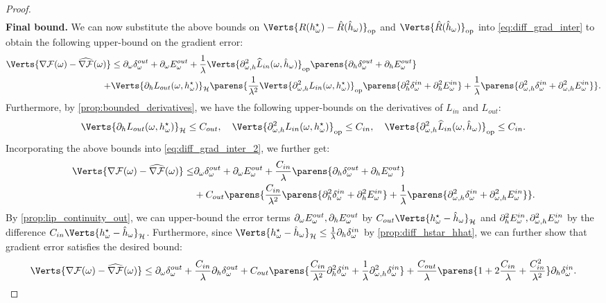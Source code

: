 \begin{proof}
\begin{align*}
    \end{align*}
{\bf Final bound.} We can now substitute the above bounds on $\Verts{R(h_{\omega}^{\star})- \hat{R}(\hat{h}_{\omega})}_{\op}$ and $\Verts{\hat{R}(\hat{h}_{\omega})}_{\op}$ into \cref{eq:diff_grad_inter} to obtain the following upper-bound on the gradient error:
 \begin{equation} \label{eq:diff_grad_inter_2}
\begin{aligned}
 	\Verts{\nabla\mathcal{F}(\omega)-\widehat{\nabla\mathcal{F}}(\omega)}
 	&\leq  
 	\Doutw + \Eoutw + \frac{1}{\lambda}\Verts{\partial_{\omega,h}^2 \widehat{L}_{in}(\omega,\hat{h}_{\omega})}_{\op}\parens{\Douth + \Eouth}\\
 	+& \Verts{\partial_{h}L_{out}(\omega,h_{\omega}^{\star})}_{\mathcal{H}}\parens{ \frac{1}{\lambda^2}\Verts{\partial^2_{\omega,h}L_{in}(\omega,h_{\omega}^{\star}) }_{\op} \parens{\Dinhh + \Einhh} + \frac{1}{\lambda}\parens{\Dinwh + \Einwh} }.
 \end{aligned}
 \end{equation}
Furthermore, by \cref{prop:bounded_derivatives}, we have the following upper-bounds on the derivatives of $L_{in}$ and $L_{out}$:
\begin{align*}
	\Verts{\partial_{h}L_{out}(\omega,h_{\omega}^{\star})}_{\mathcal{H}}\leq C_{out}, \quad \Verts{\partial^2_{\omega,h}L_{in}(\omega,h_{\omega}^{\star}) }_{\op}\leq C_{in},\quad 
	\Verts{\partial^2_{\omega,h}\widehat{L}_{in}(\omega,\hat{h}_{\omega}) }_{\op}\leq C_{in}. 
\end{align*}
Incorporating the above bounds into \cref{eq:diff_grad_inter_2}, we further get:
 \begin{align*}
 	\Verts{\nabla\mathcal{F}(\omega)-\widehat{\nabla\mathcal{F}}(\omega)}
 	\leq & 
 	\Doutw + \Eoutw + \frac{C_{in}}{\lambda}\parens{\Douth + \Eouth}\\
 	&+ C_{out}\parens{ \frac{C_{in}}{\lambda^2}\parens{\Dinhh + \Einhh} + \frac{1}{\lambda}\parens{\Dinwh + \Einwh} }.
 \end{align*}
By \cref{prop:lip_continuity_out}, we can upper-bound the error terms $\partial_{\omega}E_\omega^{out}, \partial_{h}E_\omega^{out}$ by $C_{out}\Verts{h_{\omega}^{\star}-\hat{h}_{\omega}}_{\mathcal{H}}$ and $ \partial_{h}^2E_\omega^{in},\partial_{\omega,h}^2E_\omega^{in}$ by the difference $C_{in}\Verts{h_{\omega}^{\star}-\hat{h}_{\omega}}_{\mathcal{H}}$. Furthermore, since  $\Verts{h_{\omega}^{\star}-\hat{h}_{\omega}}_{\mathcal{H}}\leq \frac{1}{\lambda}\Dinh$ by \cref{prop:diff_hstar_hhat}, we can further show that gradient error satisfies the desired bound:
\begin{align*}
 	\Verts{\nabla\mathcal{F}(\omega)-\widehat{\nabla\mathcal{F}}(\omega)}
 	\leq 
 	\Doutw  + \frac{C_{in}}{\lambda}\Douth + C_{out}\parens{ \frac{C_{in}}{\lambda^2}\Dinhh + \frac{1}{\lambda}\Dinwh}+ \frac{C_{out}}{\lambda}\parens{1 + 2\frac{C_{in}}{\lambda}  + \frac{C_{in}^2}{\lambda^2} }\Dinh.
\end{align*}
\end{proof}

